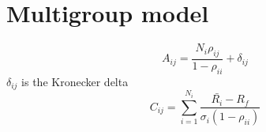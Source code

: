 \documentclass[]{amsart}
\newcommand{\p}[1]{\left(#1\right)}
\begin{document}
\section{Multigroup model}
	
$$ A_{ij} = \frac{N_i \rho_{ij}}{1-\rho_{ii}} + \delta_{ij} $$ 
$\delta_{ij}$ is the Kronecker delta 
$$ C_{ij} = \sum_{i=1}^{N_i} \frac{\bar{R_i}-R_f}{\sigma_i \p{1-\rho_{ii}}} $$
\end{document}
